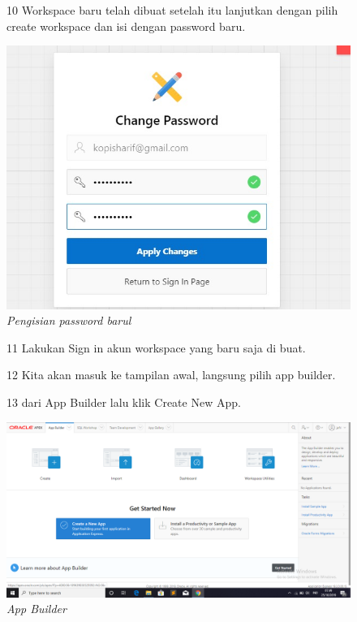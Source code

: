 \begin{enumerate}
\begin{figure}
\item[10] Workspace baru telah dibuat setelah itu lanjutkan dengan pilih create workspace dan isi dengan password baru.

    \begin{center}
\includegraphics[scale=0.5]{apex/apex5.jpeg}
    \caption{\textit{Pengisian password barul}}
        \end{center}
\label{gambar}
\end{figure}

\begin{figure}
\item[11] Lakukan Sign in akun workspace yang baru saja di buat.

\end{figure}

\begin{figure}
\item[12] Kita akan masuk ke tampilan awal, langsung pilih app builder.

    
\end{figure}

\begin{figure}
\item[13] dari App Builder lalu klik Create New App.

    \begin{center}
\includegraphics[scale=0.4]{apex/apex6.png}
    \caption{\textit{App Builder}}
        \end{center}
\label{gambar}
\end{figure}


\end{enumerate}
